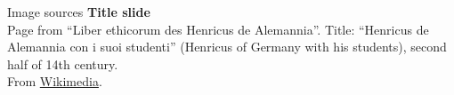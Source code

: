 \documentclass[handout,aspectratio=169]{beamer}
\begin{document}
	\backupbegin

	\begin{frame}[noframenumbering]{Image sources}
		\small
		\textbf{Title slide}\\Page from \enquote{Liber ethicorum des Henricus de Alemannia}. Title: \enquote{Henricus de Alemannia con i suoi studenti} (Henricus of Germany with his students), second half of 14th century.\\From \href{https://commons.wikimedia.org/wiki/File:Laurentius_de_Voltolina_001.jpg}{Wikimedia}.
	\end{frame}

	\backupend
	
\end{document}
